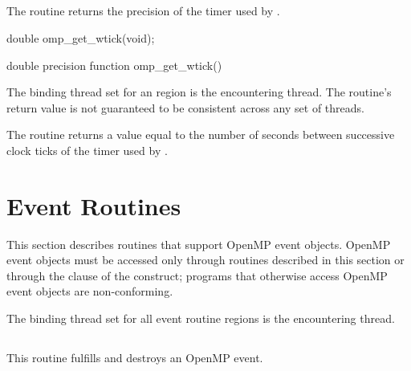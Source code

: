 \subsection{}
\label{subsec:omp_get_wtick}
\summary
The  routine returns the precision of the timer used by
.


\format
\begin{ccppspecific}
\begin{ompcFunction}
double omp_get_wtick(void);
\end{ompcFunction}
\end{ccppspecific}

\begin{fortranspecific}
\begin{ompfFunction}
double precision function omp_get_wtick()
\end{ompfFunction}
\end{fortranspecific}

\binding
The binding thread set for an  region is the encountering thread. The
routine's return value is not guaranteed to be consistent across any set of threads.

\effect
The  routine returns a value equal to the number of seconds between
successive clock ticks of the timer used by .

\section{Event Routines}
\label{sec:Event Routines}

This section describes routines that support OpenMP event objects. OpenMP event objects must be accessed only through routines described in this section or through the  clause of the  construct; programs that otherwise access OpenMP event objects are non-conforming.

\binding

The binding thread set for all event routine regions is the encountering thread.

\subsection{}
\label{subsec:omp_fulfill_event}
\summary
This routine fulfills and destroys an OpenMP event.


